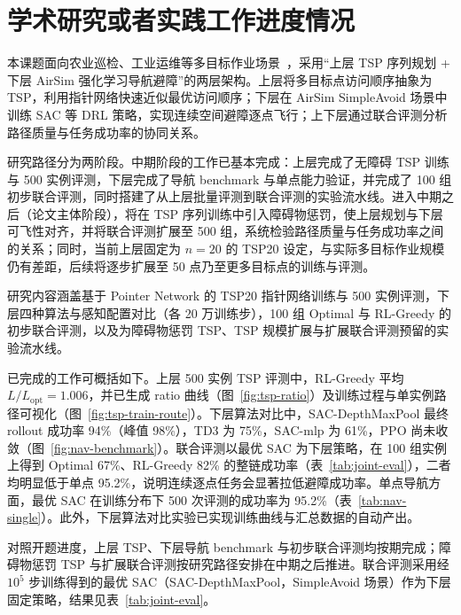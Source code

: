 
\section{学术研究或者实践工作进度情况}

本课题面向农业巡检、工业运维等多目标作业场景~\cite{huang2022ufpmp,zhu2021tph}，采用``上层 TSP 序列规划 + 下层 AirSim 强化学习导航避障''的两层架构。上层将多目标点访问顺序抽象为 TSP，利用指针网络快速近似最优访问顺序；下层在 AirSim SimpleAvoid 场景中训练 SAC 等 DRL 策略，实现连续空间避障逐点飞行；上下层通过联合评测分析路径质量与任务成功率的协同关系。

研究路径分为两阶段。中期阶段的工作已基本完成：上层完成了无障碍 TSP 训练与 500 实例评测，下层完成了导航 benchmark 与单点能力验证，并完成了 100 组初步联合评测，同时搭建了从上层批量评测到联合评测的实验流水线。进入中期之后（论文主体阶段），将在 TSP 序列训练中引入障碍物惩罚，使上层规划与下层可飞性对齐，并将联合评测扩展至 500 组，系统检验路径质量与任务成功率之间的关系；同时，当前上层固定为 $n=20$ 的 TSP20 设定，与实际多目标作业规模仍有差距，后续将逐步扩展至 50 点乃至更多目标点的训练与评测。

研究内容涵盖基于 Pointer Network 的 TSP20 指针网络训练与 500 实例评测，下层四种算法与感知配置对比（各 20 万训练步），100 组 Optimal 与 RL-Greedy 的初步联合评测，以及为障碍物惩罚 TSP、TSP 规模扩展与扩展联合评测预留的实验流水线。

已完成的工作可概括如下。上层 500 实例 TSP 评测中，RL-Greedy 平均 $L/L_{\mathrm{opt}}=1.006$，并已生成 ratio 曲线（图~\ref{fig:tsp-ratio}）及训练过程与单实例路径可视化（图~\ref{fig:tsp-train-route}）。下层算法对比中，SAC-DepthMaxPool 最终 rollout 成功率 94\%（峰值 98\%），TD3 为 75\%，SAC-mlp 为 61\%，PPO 尚未收敛（图~\ref{fig:nav-benchmark}）。联合评测以最优 SAC 为下层策略，在 100 组实例上得到 Optimal 67\%、RL-Greedy 82\% 的整链成功率（表~\ref{tab:joint-eval}），二者均明显低于单点 95.2\%，说明连续逐点任务会显著拉低避障成功率。单点导航方面，最优 SAC 在训练分布下 500 次评测的成功率为 95.2\%（表~\ref{tab:nav-single}）。此外，下层算法对比实验已实现训练曲线与汇总数据的自动产出。

对照开题进度，上层 TSP、下层导航 benchmark 与初步联合评测均按期完成；障碍物惩罚 TSP 与扩展联合评测按研究路径安排在中期之后推进。联合评测采用经 $10^5$ 步训练得到的最优 SAC（SAC-DepthMaxPool，SimpleAvoid 场景）作为下层固定策略，结果见表~\ref{tab:joint-eval}。

